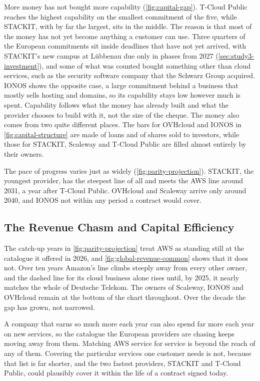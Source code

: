 More money has not bought more capability (\cref{fig:capital-gap}). T-Cloud
Public reaches the highest capability on the smallest commitment of the five,
while STACKIT, with by far the largest, sits in the middle. The reason is that
most of the money has not yet become anything a customer can use. Three quarters
of the European commitments sit inside deadlines that have not yet arrived, with
STACKIT's new campus at L\"ubbenau due only in phases from 2027
(\cref{sec:study3-investment}), and some of what was counted bought something
other than cloud services, such as the security software company that the Schwarz
Group acquired. IONOS shows the opposite case, a large commitment behind a
business that mostly sells hosting and domains, so its capability stays low
however much is spent. Capability follows what the money has already built and
what the provider chooses to build with it, not the size of the cheque. The money also comes
from two quite different places. The bars for OVHcloud and IONOS in
\cref{fig:capital-structure} are made of loans and of shares sold to investors,
while those for STACKIT, Scaleway and T-Cloud Public are filled almost entirely by
their owners.

The pace of progress varies just as widely (\cref{fig:parity-projection}).
STACKIT, the youngest provider, has the steepest line of all and meets the
\acs{AWS} line around 2031, a year after T-Cloud Public. OVHcloud and Scaleway
arrive only around 2040, and IONOS not within any period a contract would cover.

\subsection{The Revenue Chasm and Capital Efficiency}
\label{subsec:revenue-chasm}

The catch-up years in \cref{fig:parity-projection} treat \acs{AWS} as standing
still at the catalogue it offered in 2026, and \cref{fig:global-revenue-common}
shows that it does not. Over ten years Amazon's line climbs steeply away from
every other owner, and the dashed line for its cloud business alone rises until,
by 2025, it nearly matches the whole of Deutsche Telekom. The owners of Scaleway,
IONOS and OVHcloud remain at the bottom of the chart throughout. Over the decade
the gap has grown, not narrowed.

A company that earns so much more each year can also spend far more each year on
new services, so the catalogue the European providers are chasing keeps moving
away from them. Matching \acs{AWS} service for service is beyond the reach of any
of them. Covering the particular services one customer needs is not, because that
list is far shorter, and the two fastest providers, STACKIT and T-Cloud Public,
could plausibly cover it within the life of a contract signed today.


